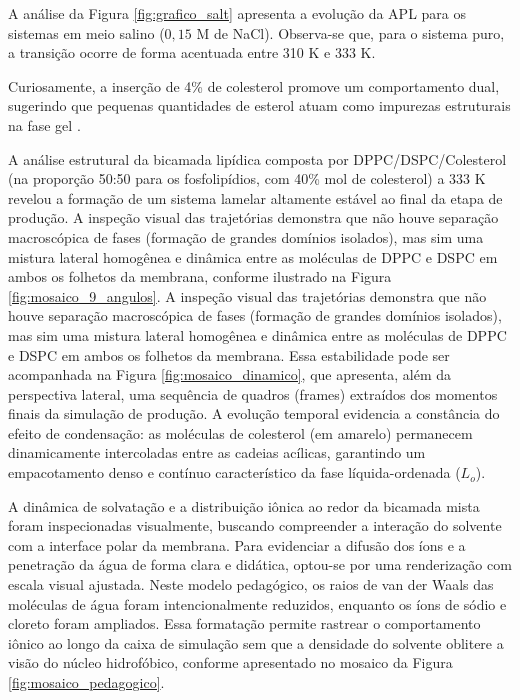 \documentclass[12pt]{article} %
\begin{document}
A análise da Figura \ref{fig:grafico_salt} apresenta a evolução da APL para os sistemas em meio salino ($0,15$ M de NaCl). Observa-se que, para o sistema puro, a transição ocorre de forma acentuada entre 310 K e 333 K. 


Curiosamente, a inserção de 4\% de colesterol promove um comportamento dual, sugerindo que pequenas quantidades de esterol atuam como impurezas estruturais na fase gel \cite{pedersen2024}.

A análise estrutural da bicamada lipídica composta por DPPC/DSPC/Colesterol (na proporção 50:50 para os fosfolipídios, com 40\% mol de colesterol) a 333 K revelou a formação de um sistema lamelar altamente estável ao final da etapa de produção. A inspeção visual das trajetórias demonstra que não houve separação macroscópica de fases (formação de grandes domínios isolados), mas sim uma mistura lateral homogênea e dinâmica entre as moléculas de DPPC e DSPC em ambos os folhetos da membrana, conforme ilustrado na Figura \ref{fig:mosaico_9_angulos}.
A inspeção visual das trajetórias demonstra que não houve separação macroscópica de fases (formação de grandes domínios isolados), mas sim uma mistura lateral homogênea e dinâmica entre as moléculas de DPPC e DSPC em ambos os folhetos da membrana. Essa estabilidade pode ser acompanhada na Figura \ref{fig:mosaico_dinamico}, que apresenta, além da perspectiva lateral, uma sequência de quadros (frames) extraídos dos momentos finais da simulação de produção. A evolução temporal evidencia a constância do efeito de condensação: as moléculas de colesterol (em amarelo) permanecem dinamicamente intercoladas entre as cadeias acílicas, garantindo um empacotamento denso e contínuo característico da fase líquida-ordenada ($L_o$).

A dinâmica de solvatação e a distribuição iônica ao redor da bicamada mista foram inspecionadas visualmente, buscando compreender a interação do solvente com a interface polar da membrana. Para evidenciar a difusão dos íons e a penetração da água de forma clara e didática, optou-se por uma renderização com escala visual ajustada. Neste modelo pedagógico, os raios de van der Waals das moléculas de água foram intencionalmente reduzidos, enquanto os íons de sódio e cloreto foram ampliados. Essa formatação permite rastrear o comportamento iônico ao longo da caixa de simulação sem que a densidade do solvente oblitere a visão do núcleo hidrofóbico, conforme apresentado no mosaico da Figura \ref{fig:mosaico_pedagogico}.
\end{document}
